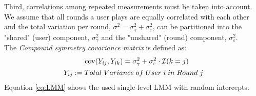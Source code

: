 Third, correlations among repeated measurements must be taken into account. We assume that all rounds a user plays are equally correlated with each other and the total variation per round, $\sigma^{2} = \sigma^{2}_{\gamma} + \sigma^{2}_{\varepsilon}$, can be partitioned into the "shared" (user) component, $\sigma^{2}_{\gamma}$ and the "unshared" (round) component, $\sigma^{2}_{\varepsilon}$. \\
The \textit{Compound symmetry covariance matrix} is defined as:
\begin{equation}
\begin{split}
{\rm cov}(Y_{ij}, Y_{ik}) = \sigma^{2}_{\gamma} + \sigma^{2}_{\varepsilon} \cdot \mathcal{I}(k = j) \quad \quad \\
Y_{ij}:= Total\;Variance\;of\;User\;i\;in\;Round\;j
\end{split}
\end{equation}
Equation \ref{eq:LMM} shows the used single-level \ac{LMM} with random intercepts.


